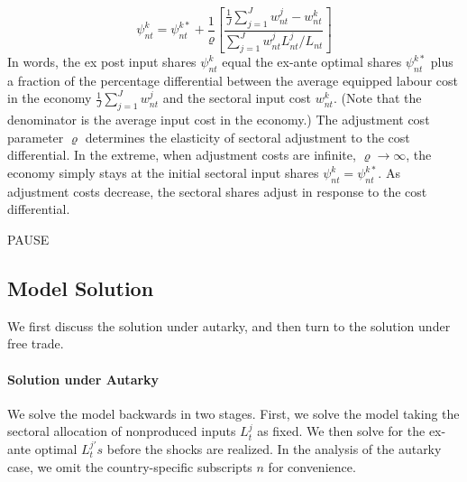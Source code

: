 \documentclass{article}
\begin{document}
\begin{equation*}
\psi _{nt}^{k}=\psi _{nt}^{k\ast }+\frac{1}{\varrho }\left[ \frac{\frac{1}{J}%
\sum_{j=1}^{J}w_{nt}^{j}-w_{nt}^{k}}{\sum_{j=1}^{J}w_{nt}^{j}L_{nt}^{j}/L_{nt}}%
\right] 
\end{equation*}%
In words, the ex post input shares $\psi _{nt}^{k}$ equal the ex-ante
optimal shares $\psi _{nt}^{k\ast }$ plus a fraction of the percentage differential
between the average equipped labour cost in the economy $\frac{1}{J}%
\sum_{j=1}^{J}w_{nt}^{j}$ and the sectoral input cost $w_{nt}^{k}$. 
(Note that the denominator is the average input cost in the economy.)
The
adjustment cost parameter $\varrho $ determines the elasticity of sectoral
adjustment to the cost differential. In the extreme, when adjustment costs
are infinite, $\varrho \rightarrow \infty $, the economy simply stays at the
initial sectoral input shares $\psi _{nt}^{k}=\psi _{nt}^{k\ast }$. As
adjustment costs decrease, the sectoral shares adjust in response to the
cost differential.

\bigskip

PAUSE

\subsection{Model Solution}

We first discuss the solution under autarky, and then turn to the solution
under free trade.

\paragraph{Solution under Autarky}

We solve the model backwards in two stages. First, we solve the model taking
the sectoral allocation of nonproduced inputs $L_{t}^{j}$ as fixed. We then
solve for the ex-ante optimal $L_{t}^{j\prime }s$ before the shocks are
realized. In the analysis of the autarky case, we omit the country-specific
subscripts $n$ for convenience.
\end{document}
